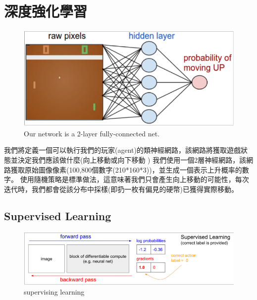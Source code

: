 \documentclass[14pt,a4paper]{report}  %
\begin{document}
\section{深度強化學習}
\begin{figure}[hbt!]
\begin{center}
\includegraphics[scale=0.74]{ network}
\caption{Our network is a 2-layer fully-connected net. }%
\end{center}

\end{figure}

\qquad 我們將定義一個可以執行我們的玩家(agent)的類神經網路，該網路將獲取遊戲狀態並決定我們應該做什麼(向上移動或向下移動
) 我們使用一個2層神經網路，該網路獲取原始圖像像素(100,800個數字(210*160*3))，並生成一個表示上升概率的數字。 使用隨機策略是標準做法，這意味著我們只會產生向上移動的可能性，每次迭代時，我們都會從該分布中採樣(即扔一枚有偏見的硬幣)已獲得實際移動。\\


\subsection{Supervised Learning}
\begin{figure}[hbt!]
\begin{center}
\includegraphics[scale=0.74]{supervising_learning}
\caption{supervising learning }%
\end{center}
\end{figure}
\end{document}
